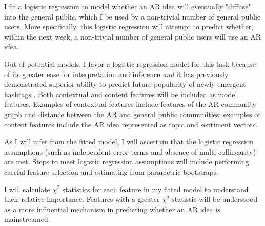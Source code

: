 \documentclass[acmlarge, screen, authorversion]{acmart}
\begin{document}

I fit a logistic regression to model whether an AR idea will eventually "diffuse" into the general public, which I 
be used by a non-trivial number of general public users. More specifically, this
logistic regression will attempt to predict whether, within the next week, a
non-trivial number of general public users will use an AR idea.

Out of potential models, I favor a logistic regression model for this task
because of its greater ease for interpretation and inference \textit{and} it has
previously demonstrated superior ability to predict future popularity of newly
emergent hashtags \cite{maPredictingPopularityNewly2013}. Both contextual and
content features will be included as model features. Examples of contextual
features include features of the AR community graph and distance between the AR
and general public communities; examples of content features include the AR idea
represented as topic and sentiment vectors.

As I will infer from the fitted model, I will ascertain that the logistic
regression assumptions (such as independent error terms and absence of
multi-collinearity) are met. Steps to meet logistic regression assumptions will
include performing careful feature selection and estimating from parametric
bootstraps.

I will calculate $\chi^2$ statistics for each feature in my fitted model to
understand their relative importance. Features with a greater $\chi^2$ statistic
will be understood as a more influential mechanism in predicting whether an AR
idea is mainstreamed.
\end{document}
